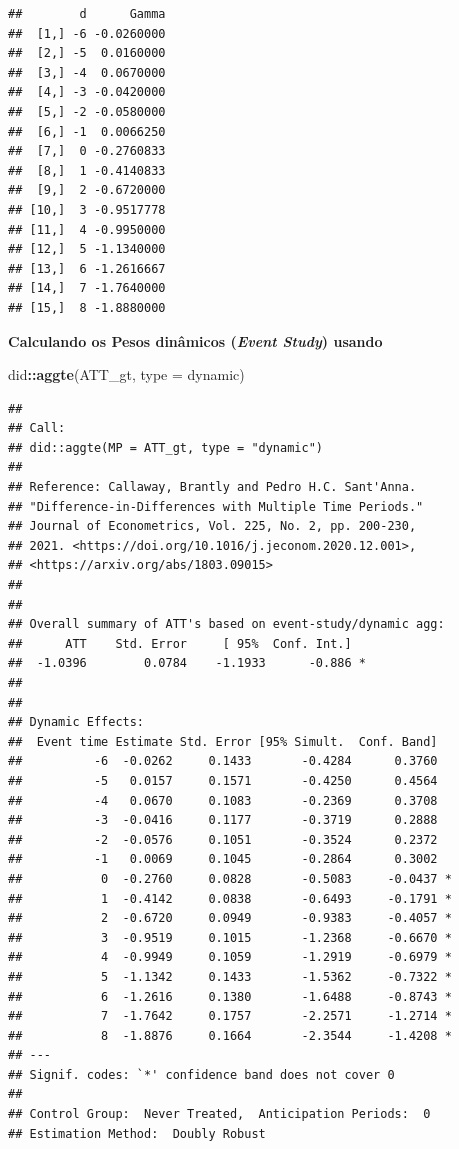 \documentclass[portugues]{article}
\newenvironment{Shaded}{\begin{snugshade}}{\end{snugshade}}
\newcommand{\AttributeTok}[1]{\textcolor[rgb]{0.13,0.29,0.53}{#1}}
\newcommand{\FunctionTok}[1]{\textcolor[rgb]{0.13,0.29,0.53}{\textbf{#1}}}
\newcommand{\NormalTok}[1]{#1}
\newcommand{\SpecialCharTok}[1]{\textcolor[rgb]{0.81,0.36,0.00}{\textbf{#1}}}
\newcommand{\StringTok}[1]{\textcolor[rgb]{0.31,0.60,0.02}{#1}}
\begin{document}
\begin{box_code}
\begin{verbatim}
##        d      Gamma
##  [1,] -6 -0.0260000
##  [2,] -5  0.0160000
##  [3,] -4  0.0670000
##  [4,] -3 -0.0420000
##  [5,] -2 -0.0580000
##  [6,] -1  0.0066250
##  [7,]  0 -0.2760833
##  [8,]  1 -0.4140833
##  [9,]  2 -0.6720000
## [10,]  3 -0.9517778
## [11,]  4 -0.9950000
## [12,]  5 -1.1340000
## [13,]  6 -1.2616667
## [14,]  7 -1.7640000
## [15,]  8 -1.8880000
\end{verbatim}

\noindent \textbf{Calculando os Pesos dinâmicos (\textit{Event Study}) usando \cite{callaway2021difference}}

\begin{Shaded}
\begin{Highlighting}[]
\NormalTok{did}\SpecialCharTok{::}\FunctionTok{aggte}\NormalTok{(ATT\_gt, }\AttributeTok{type =} \StringTok{\textquotesingle{}dynamic\textquotesingle{}}\NormalTok{)}
\end{Highlighting}
\end{Shaded}

\begin{verbatim}
## 
## Call:
## did::aggte(MP = ATT_gt, type = "dynamic")
## 
## Reference: Callaway, Brantly and Pedro H.C. Sant'Anna.  
## "Difference-in-Differences with Multiple Time Periods." 
## Journal of Econometrics, Vol. 225, No. 2, pp. 200-230, 
## 2021. <https://doi.org/10.1016/j.jeconom.2020.12.001>, 
## <https://arxiv.org/abs/1803.09015> 
## 
## 
## Overall summary of ATT's based on event-study/dynamic agg:  
##      ATT    Std. Error     [ 95%  Conf. Int.]  
##  -1.0396        0.0784    -1.1933      -0.886 *
## 
## 
## Dynamic Effects:
##  Event time Estimate Std. Error [95% Simult.  Conf. Band]  
##          -6  -0.0262     0.1433       -0.4284      0.3760  
##          -5   0.0157     0.1571       -0.4250      0.4564  
##          -4   0.0670     0.1083       -0.2369      0.3708  
##          -3  -0.0416     0.1177       -0.3719      0.2888  
##          -2  -0.0576     0.1051       -0.3524      0.2372  
##          -1   0.0069     0.1045       -0.2864      0.3002  
##           0  -0.2760     0.0828       -0.5083     -0.0437 *
##           1  -0.4142     0.0838       -0.6493     -0.1791 *
##           2  -0.6720     0.0949       -0.9383     -0.4057 *
##           3  -0.9519     0.1015       -1.2368     -0.6670 *
##           4  -0.9949     0.1059       -1.2919     -0.6979 *
##           5  -1.1342     0.1433       -1.5362     -0.7322 *
##           6  -1.2616     0.1380       -1.6488     -0.8743 *
##           7  -1.7642     0.1757       -2.2571     -1.2714 *
##           8  -1.8876     0.1664       -2.3544     -1.4208 *
## ---
## Signif. codes: `*' confidence band does not cover 0
## 
## Control Group:  Never Treated,  Anticipation Periods:  0
## Estimation Method:  Doubly Robust
\end{verbatim}


\end{box_code}
\end{document}
